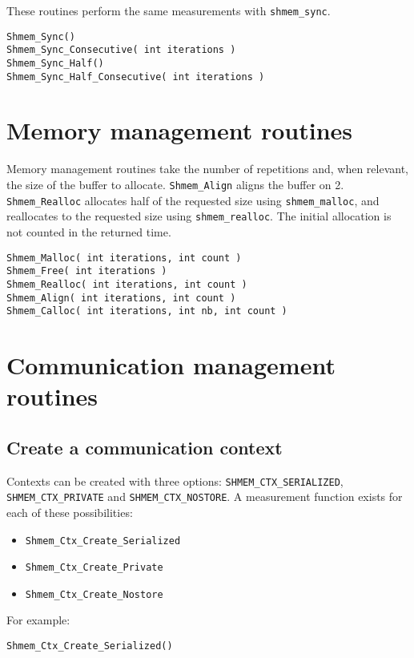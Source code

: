 \documentclass[12pt, letterpaper]{article}
\begin{document}
These routines perform the same measurements with {\tt shmem\_sync}.

\begin{lstlisting}
Shmem_Sync()
Shmem_Sync_Consecutive( int iterations )
Shmem_Sync_Half()
Shmem_Sync_Half_Consecutive( int iterations )
\end{lstlisting}

\section{Memory management routines}

Memory management routines take the number of repetitions and, when relevant, the size of the buffer to allocate. {\tt Shmem\_Align} aligns the buffer on 2. {\tt Shmem\_Realloc} allocates half of the requested size using {\tt shmem\_malloc}, and reallocates to the requested size using {\tt shmem\_realloc}. The initial allocation is not counted in the returned time.

\begin{lstlisting}
Shmem_Malloc( int iterations, int count )
Shmem_Free( int iterations )
Shmem_Realloc( int iterations, int count )
Shmem_Align( int iterations, int count )
Shmem_Calloc( int iterations, int nb, int count )
\end{lstlisting}

\section{Communication management routines}

\subsection{Create a communication context}

Contexts can be created with three options: {\tt SHMEM\_CTX\_SERIALIZED}, {\tt SHMEM\_CTX\_PRIVATE} and {\tt SHMEM\_CTX\_NOSTORE}. A measurement function exists for each of these possibilities:

\begin{itemize}
\item {\tt Shmem\_Ctx\_Create\_Serialized}
\item {\tt Shmem\_Ctx\_Create\_Private}
\item {\tt Shmem\_Ctx\_Create\_Nostore}
\end{itemize}

For example:
\begin{lstlisting}
Shmem_Ctx_Create_Serialized()
\end{lstlisting}
\end{document}
